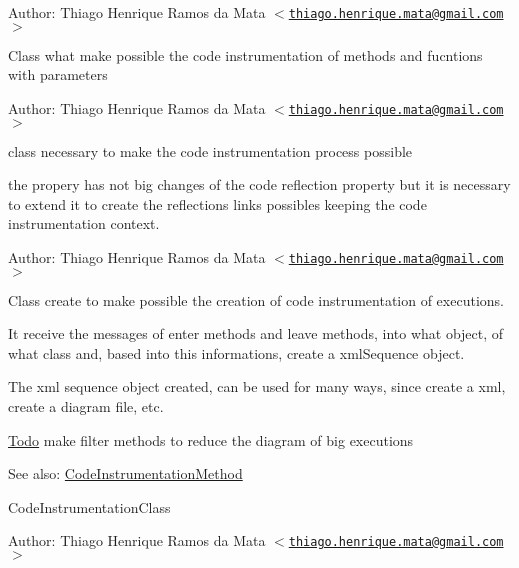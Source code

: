 \begin{Desc}
\item[Author:]Thiago Henrique Ramos da Mata $<$\href{mailto:thiago.henrique.mata@gmail.com}{\tt thiago.henrique.mata@gmail.com}$>$\end{Desc}
Class what make possible the code instrumentation of methods and fucntions with parameters

\begin{Desc}
\item[Author:]Thiago Henrique Ramos da Mata $<$\href{mailto:thiago.henrique.mata@gmail.com}{\tt thiago.henrique.mata@gmail.com}$>$\end{Desc}
class necessary to make the code instrumentation process possible

the propery has not big changes of the code reflection property but it is necessary to extend it to create the reflections links possibles keeping the code instrumentation context.

\begin{Desc}
\item[Author:]Thiago Henrique Ramos da Mata $<$\href{mailto:thiago.henrique.mata@gmail.com}{\tt thiago.henrique.mata@gmail.com}$>$\end{Desc}
Class create to make possible the creation of code instrumentation of executions.

It receive the messages of enter methods and leave methods, into what object, of what class and, based into this informations, create a xmlSequence object.

The xml sequence object created, can be used for many ways, since create a xml, create a diagram file, etc.

\begin{Desc}
\item[\hyperlink{todo__todo000002}{Todo}]make filter methods to reduce the diagram of big executions\end{Desc}
\begin{Desc}
\item[See also:]\hyperlink{class_code_instrumentation_method}{CodeInstrumentationMethod} 

CodeInstrumentationClass \end{Desc}
\begin{Desc}
\item[Author:]Thiago Henrique Ramos da Mata $<$\href{mailto:thiago.henrique.mata@gmail.com}{\tt thiago.henrique.mata@gmail.com}$>$ \end{Desc}


